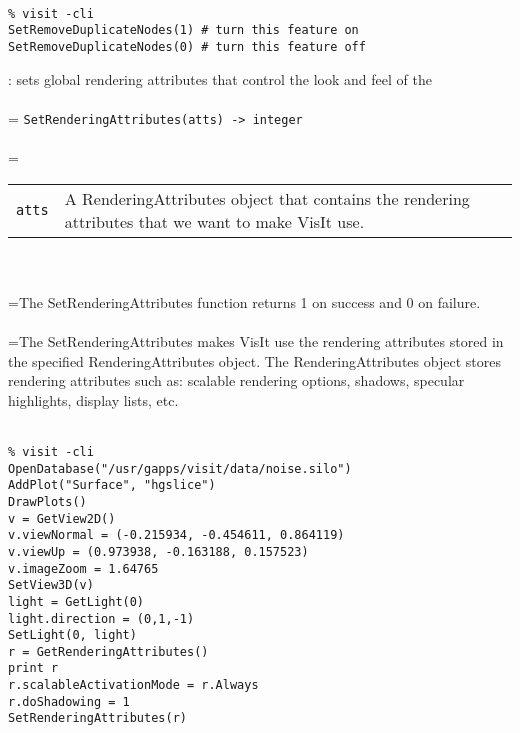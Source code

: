 \documentclass[10pt,a4paper]{report}
\begin{document}
\\[-6mm]
\begin{verbatim}% visit -cli
SetRemoveDuplicateNodes(1) # turn this feature on
SetRemoveDuplicateNodes(0) # turn this feature off
\end{verbatim}
\newpage


{}
: sets global rendering attributes that control the look and feel of the\\[-3mm]

 \\ 
\hangindent=\parindent 
\verb!SetRenderingAttributes(atts) -> integer!\\ [-3mm]

 \\ 
\hangindent=\parindent 
\begin{tabular}{lp{9cm}}
\verb!atts! & A RenderingAttributes object that contains the rendering attributes that we want to make VisIt use. \\
\end{tabular} \\[-2mm]


 \\ 
\hangindent=\parindent The SetRenderingAttributes function returns 1 on success and 0 on failure. \\[-3mm] 

 \\ 
\hangindent=\parindent The SetRenderingAttributes makes VisIt use the rendering attributes stored in the specified RenderingAttributes object. The RenderingAttributes object stores rendering attributes such as: scalable rendering options, shadows, specular highlights, display lists, etc. \\[-3mm] 

\\[-6mm]
\begin{verbatim}% visit -cli
OpenDatabase("/usr/gapps/visit/data/noise.silo")
AddPlot("Surface", "hgslice")
DrawPlots()
v = GetView2D()
v.viewNormal = (-0.215934, -0.454611, 0.864119)
v.viewUp = (0.973938, -0.163188, 0.157523)
v.imageZoom = 1.64765
SetView3D(v)
light = GetLight(0)
light.direction = (0,1,-1)
SetLight(0, light)
r = GetRenderingAttributes()
print r
r.scalableActivationMode = r.Always
r.doShadowing = 1
SetRenderingAttributes(r)
\end{verbatim}
\newpage
\end{document}
